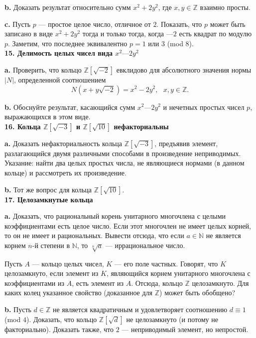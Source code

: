 \textbf{b.} Доказать результат относительно сумм $x^2 + 2 y^2$, где $x,y \in \mathbb{Z}$ взаимно просты.

\textbf{c.} Пусть $p$ — простое целое число, отличное от $2$. Показать, что
$p$ может быть записано в виде $x^2 + 2 y^2$ тогда и только тогда, когда
$—2$ есть квадрат по модулю $p$. Заметим, что последнее эквивалентно
$p = 1$ или $3$ (mod $8$).
\\

\noindent \textbf{15. Делимость целых чисел вида $x^2 — 2 y^2$}

\textbf{a.} Проверить, что кольцо $\mathbb{Z}[\sqrt{-2}]$ евклидово для абсолютного значения нормы $|N|$, определенной соотношением
\[
N(x+y\sqrt{-2})=x^2-2 y^2, \text{ } x,y \in \mathbb{Z}.
\]

\textbf{b.} Обоснуйте результат, касающийся сумм $x^2 — 2 y^2$ и нечетных
простых чисел $p$, выражающихся в этом виде.
\\

\noindent \textbf{16. Кольца $\mathbb{Z}[\sqrt{-3}]$ и $\mathbb{Z}[\sqrt{10}]$ нефакториальны}

\textbf{a.} Доказать нефакториальность кольца $\mathbb{Z}[\sqrt{-3}]$, предъявив элемент, разлагающийся двумя различными способами в произведение 
неприводимых. Указание: найти два целых простых числа, не являющиеся
нормами (в данном кольце) и рассмотреть их произведение.

\textbf{b.} Тот же вопрос для кольца $\mathbb{Z}[\sqrt{10}]$.
\\

\noindent \textbf{17. Целозамкнутые кольца}

\textbf{a.} Доказать, что рациональный корень унитарного многочлена с
целыми коэффициентами есть целое число. Если этот многочлен не
имеет целых корней, то он не имеет и рациональных. Вывести отсюда,
что если $a \in \mathbb{N}$ не является корнем $n$-й степени в $\mathbb{N}$, то $\sqrt[n]{a}$ — иррациональное число.

Пусть $A$ — кольцо целых чисел, $K$ — его поле частных. Говорят, что
$K$ целозамкнуто, если элемент из $K$, являющийся корнем унитарного
многочлена с коэффициентами из $A$, есть элемент из $A$. Отсюда, 
кольцо $\mathbb{Z}$ целозамкнуто. Для каких колец указанное свойство (доказанное для $\mathbb{Z}$) может быть обобщено?

\textbf{b.} Пусть $d \in \mathbb{Z}$ не является квадратичным и удовлетворяет 
соотношению $d \equiv 1$ (mod $4$). Доказать, что кольцо $\mathbb{Z}[\sqrt{d}]$ не целозамкнуто (и потому не факториально). Доказать также, что $2$ — неприводимый элемент, но непростой.

